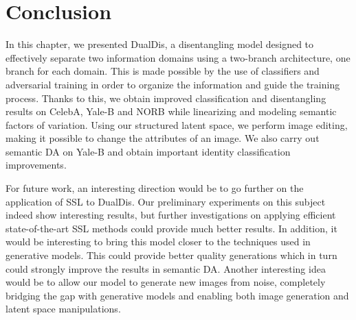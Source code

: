 \section{Conclusion}

In this chapter, we presented DualDis, a disentangling model designed to effectively separate two information domains using a two-branch architecture, one branch for each domain. This is made possible by the use of classifiers and adversarial training in order to organize the information and guide the training process. Thanks to this, we obtain improved classification and disentangling results on CelebA, Yale-B and NORB while linearizing and modeling semantic factors of variation.
Using our structured latent space, we perform image editing, making it possible to change the attributes of an image. We also carry out semantic \acf{DA} on Yale-B and obtain important identity classification improvements.

For future work, an interesting direction would be to go further on the application of \acf{SSL} to DualDis. Our preliminary experiments on this subject indeed show interesting results, but further investigations on applying efficient state-of-the-art \ac{SSL} methods could provide much better results.
In addition, it would be interesting to bring this model closer to the techniques used in generative models. This could provide better quality generations which in turn could strongly improve the results in semantic \acf{DA}. Another interesting idea would be to allow our model to generate new images from noise, completely bridging the gap with generative models and enabling both image generation and latent space manipulations.


